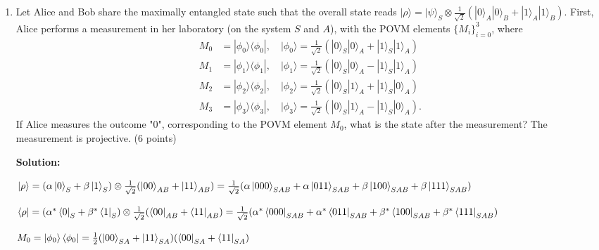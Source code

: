 \documentclass[12pt]{article}
\begin{document}
\begin{enumerate}
    \item Let Alice and Bob share the maximally entangled state such that the overall state reads $|\rho\rangle = |\psi\rangle_S \otimes \frac{1}{\sqrt{2}}(|0\rangle_A|0\rangle_B + |1\rangle_A|1\rangle_B)$. First, Alice performs a measurement in her laboratory (on the system $S$ and $A$), with the POVM elements $\{M_i\}_{i=0}^3$, where
          \begin{align*}
              M_0 & = |\phi_0\rangle\langle\phi_0|, \quad |\phi_0\rangle = \frac{1}{\sqrt{2}}(|0\rangle_S|0\rangle_A + |1\rangle_S|1\rangle_A)  \\
              M_1 & = |\phi_1\rangle\langle\phi_1|, \quad |\phi_1\rangle = \frac{1}{\sqrt{2}}(|0\rangle_S|0\rangle_A - |1\rangle_S|1\rangle_A)  \\
              M_2 & = |\phi_2\rangle\langle\phi_2|, \quad |\phi_2\rangle = \frac{1}{\sqrt{2}}(|0\rangle_S|1\rangle_A + |1\rangle_S|0\rangle_A)  \\
              M_3 & = |\phi_3\rangle\langle\phi_3|, \quad |\phi_3\rangle = \frac{1}{\sqrt{2}}(|0\rangle_S|1\rangle_A - |1\rangle_S|0\rangle_A).
          \end{align*}
          If Alice measures the outcome "0", corresponding to the POVM element $M_0$, what is the state after the measurement? The measurement is projective. (6 points)

          \textbf{Solution:}


          $\ket{\rho} = (\alpha\ket{0}_S+\beta\ket{1}_S)\otimes\frac{1}{\sqrt{2}}(\ket{00}_{AB}+\ket{11}_{AB})
              =\frac{1}{\sqrt{2}}(\alpha\ket{000}_{SAB}+\alpha\ket{011}_{SAB}+\beta\ket{100}_{SAB}+\beta\ket{111}_{SAB})$

          $\bra{\rho} = (\alpha^*\bra{0}_S+\beta^*\bra{1}_S)\otimes\frac{1}{\sqrt{2}}(\bra{00}_{AB}+\bra{11}_{AB})
              =\frac{1}{\sqrt{2}}(\alpha^*\bra{000}_{SAB}+\alpha^*\bra{011}_{SAB}+\beta^*\bra{100}_{SAB}+\beta^*\bra{111}_{SAB})$

          $M_0 = \ket{\phi_0}\bra{\phi_0} = \frac{1}{2}(\ket{00}_{SA}+\ket{11}_{SA})(\bra{00}_{SA}+\bra{11}_{SA})$




\end{enumerate}
\end{document}
